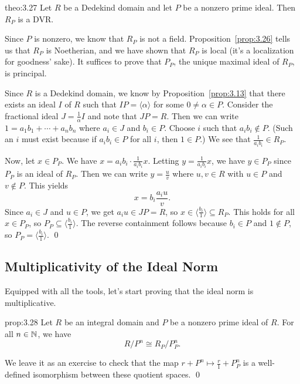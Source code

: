 \begin{theo}{theo:3.27}
    Let $R$ be a Dedekind domain and let $P$ be a nonzero prime ideal. 
    Then $R_P$ is a DVR. 
\end{theo}\vspace{-0.25cm}
\begin{pf}
    Since $P$ is nonzero, we know that $R_P$ is not a field. 
    Proposition~\ref{prop:3.26} tells us that $R_P$ is Noetherian, 
    and we have shown that $R_P$ is local (it's a localization 
    for goodness' sake). It suffices to prove that $P_P$, the unique 
    maximal ideal of $R_P$, is principal. 

    Since $R$ is a Dedekind domain, we know by Proposition~\ref{prop:3.13} 
    that there exists an ideal $I$ of $R$ such that $IP = \langle \alpha 
    \rangle$ for some $0 \neq \alpha \in P$. Consider the fractional 
    ideal $J = \frac{1}{\alpha} I$ and note that $JP = R$. Then 
    we can write $1 = a_1 b_1 + \cdots + a_n b_n$ where $a_i \in J$ and 
    $b_i \in P$. Choose $i$ such that $a_i b_i \notin P$. 
    (Such an $i$ must exist because if $a_i b_i \in P$ for all $i$, 
    then $1 \in P$.) We see that $\frac{1}{a_i b_i} \in R_P$.
    
    Now, let $x \in P_P$. We have $x = a_i b_i \cdot \frac{1}{a_i b_i} x$.
    Letting $y = \frac{1}{a_i b_i} x$, we have $y \in P_P$ since 
    $P_P$ is an ideal of $R_P$. Then we can write $y = \frac{u}{v}$ where 
    $u, v \in R$ with $u \in P$ and $v \notin P$. This yields 
    \[ x = b_i \frac{a_i u}{v}. \] 
    Since $a_i \in J$ and $u \in P$, we get $a_i u \in JP = R$, so 
    $x \in \langle \frac{b_i}{1} \rangle \subseteq R_P$. This holds for 
    all $x \in P_P$, so $P_P \subseteq \langle \frac{b_i}{1} \rangle$. 
    The reverse containment follows because $b_i \in P$ and $1 \notin P$, 
    so $P_P = \langle \frac{b_i}{1} \rangle$. \qed 
\end{pf}\vspace{-0.25cm}

\subsection{Multiplicativity of the Ideal Norm} \label{subsec:3.7}
Equipped with all the tools, let's start proving that the ideal 
norm is multiplicative.

\begin{prop}{prop:3.28}
    Let $R$ be an integral domain and $P$ be a nonzero prime ideal of $R$. 
    For all $n \in \mathbb{N}$, we have 
    \[ R/P^n \cong R_P/P_P^n. \] 
\end{prop}\vspace{-0.25cm}
\begin{pf}
    We leave it as an exercise to check that the map
    $r + P^n \mapsto \frac{r}{1} + P_P^n$
    is a well-defined isomorphism between these quotient spaces. \qed
\end{pf}\vspace{-0.25cm}

